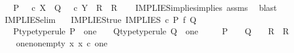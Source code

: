 \begin{isabellebody}
\ \ \ {\isachardoublequoteopen}{\isacharparenleft}{\kern0pt}P\ {\isacharequal}{\kern0pt}\ {\isasymt}\ {\isasymcirc}\isactrlsub c\ {\isasymbeta}\isactrlbsub X\isactrlesub {\isacharparenright}{\kern0pt}\ {\isasymLongrightarrow}\ {\isacharparenleft}{\kern0pt}{\isacharparenleft}{\kern0pt}Q\ {\isacharequal}{\kern0pt}\ {\isasymt}\ {\isasymcirc}\isactrlsub c\ {\isasymbeta}\isactrlbsub Y\isactrlesub {\isacharparenright}{\kern0pt}\ {\isasymLongrightarrow}\ R{\isacharparenright}{\kern0pt}\ {\isasymLongrightarrow}\ R{\isachardoublequoteclose}\isanewline
%
\isadelimproof
\ \ %
\endisadelimproof
%
\isatagproof
{}\isamarkupfalse%
\ IMPLIES{\isacharunderscore}{\kern0pt}implies{\isacharunderscore}{\kern0pt}implies\ assms\ \isamarkupfalse%
\ blast%
\endisatagproof
{\isafoldproof}%
%
\isadelimproof
\isanewline
%
\endisadelimproof
\isanewline
{}\isamarkupfalse%
\ IMPLIES{\isacharunderscore}{\kern0pt}elim{\isacharprime}{\kern0pt}{\isacharprime}{\kern0pt}{\isacharcolon}{\kern0pt}\isanewline
\ \ \ IMPLIES{\isacharunderscore}{\kern0pt}true{\isacharcolon}{\kern0pt}\ {\isachardoublequoteopen}IMPLIES\ {\isasymcirc}\isactrlsub c\ {\isacharparenleft}{\kern0pt}P\ {\isasymtimes}\isactrlsub f\ Q{\isacharparenright}{\kern0pt}\ {\isacharequal}{\kern0pt}\ {\isasymt}{\isachardoublequoteclose}\isanewline
\ \ \ P{\isacharunderscore}{\kern0pt}type{\isacharbrackleft}{\kern0pt}type{\isacharunderscore}{\kern0pt}rule{\isacharbrackright}{\kern0pt}{\isacharcolon}{\kern0pt}\ {\isachardoublequoteopen}P\ {\isacharcolon}{\kern0pt}\ one\ {\isasymrightarrow}\ {\isasymOmega}{\isachardoublequoteclose}\ \ Q{\isacharunderscore}{\kern0pt}type{\isacharbrackleft}{\kern0pt}type{\isacharunderscore}{\kern0pt}rule{\isacharbrackright}{\kern0pt}{\isacharcolon}{\kern0pt}\ {\isachardoublequoteopen}Q\ {\isacharcolon}{\kern0pt}\ one\ {\isasymrightarrow}\ {\isasymOmega}{\isachardoublequoteclose}\isanewline
\ \ \ {\isachardoublequoteopen}{\isacharparenleft}{\kern0pt}P\ {\isacharequal}{\kern0pt}\ {\isasymt}{\isacharparenright}{\kern0pt}\ {\isasymLongrightarrow}\ {\isacharparenleft}{\kern0pt}{\isacharparenleft}{\kern0pt}Q\ {\isacharequal}{\kern0pt}\ {\isasymt}{\isacharparenright}{\kern0pt}\ {\isasymLongrightarrow}\ R{\isacharparenright}{\kern0pt}\ {\isasymLongrightarrow}\ R{\isachardoublequoteclose}\isanewline
%
\isadelimproof
%
\endisadelimproof
%
\isatagproof
{}\isamarkupfalse%
\ {\isacharminus}{\kern0pt}\isanewline
\ \ \isamarkupfalse%
\ one{\isacharunderscore}{\kern0pt}nonempty{\isacharcolon}{\kern0pt}\ {\isachardoublequoteopen}{\isasymexists}x{\isachardot}{\kern0pt}\ x\ {\isasymin}\isactrlsub c\ one{\isachardoublequoteclose}\isanewline

\end{isabellebody}
